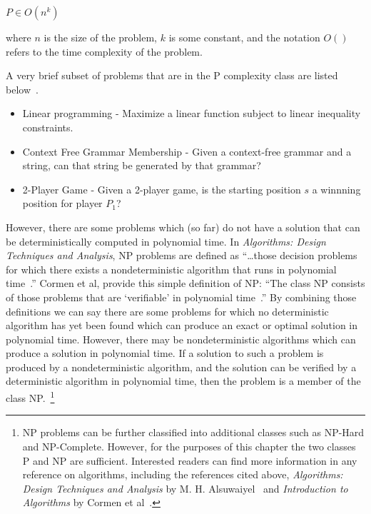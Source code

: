 \(P \in O(n^{k})\)

where \(n\) is the size of the problem, \(k\) is some constant, and the
notation \(O()\) refers to the time complexity of the problem.

A very brief subset of problems that are in the P complexity class are listed
below~\cite{greenlaw1991compendium}.

\begin{itemize}
\item{Linear programming - Maximize a linear function subject to linear
inequality constraints.} 
\item{Context Free Grammar Membership - Given a context-free grammar and a
string, can that string be generated by that grammar?}
\item {2-Player Game - Given a 2-player game, is the starting position \(s\) a
winnning position for player \(P_1\)?}
\end{itemize}

However, there are some problems which (so far) do not have a solution that can
be deterministically computed in polynomial time. In \emph{Algorithms: Design
Techniques and Analysis}, NP problems are defined as ``\ldots those decision
problems for which there exists a nondeterministic algorithm that runs in
polynomial time~\cite{alsuwaiyel1999algorithms}.'' Cormen et al, provide this
simple definition of NP: ``The class NP consists of those problems that are
`verifiable' in polynomial time~\cite{Cormen:2009:IAT:1614191}.'' By combining
those definitions we can say there are some problems for which no deterministic
algorithm has yet been found which can produce an exact or optimal solution in
polynomial time. However, there may be nondeterministic algorithms which can
produce a solution in polynomial time. If a solution to such a problem is
produced by a nondeterministic algorithm, and the solution can be verified by a
deterministic algorithm in polynomial time, then the problem is a member of the
class NP.~\footnote{NP problems can be further classified into additional
classes such as NP-Hard and NP-Complete. However, for the purposes of this
chapter the two classes P and NP are sufficient. Interested readers can find
more information in any reference on algorithms, including the references cited
above, \emph{Algorithms: Design Techniques and Analysis} by M. H.
Alsuwaiyel~\cite{alsuwaiyel1999algorithms} and \emph{Introduction to Algorithms}
by Cormen et al~\cite{Cormen:2009:IAT:1614191}.}

